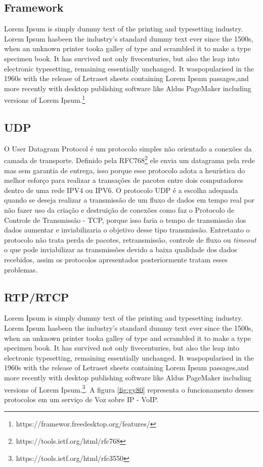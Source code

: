 \documentclass[
	12pt,				%
	openright,			%
	oneside,			%
	a4paper,			%
	chapter=TITLE,		%
	english,			%
	brazil,				%
	]{abntex2}
\begin{document}
\subsection{Framework}
Lorem Ipsum is simply dummy text of the printing and typesetting industry. Lorem Ipsum hasbeen the industry’s standard dummy text ever since the 1500s, when an unknown printer tooka galley of type and scrambled it to make a type specimen book. It has survived not only fivecenturies, but also the leap into electronic typesetting, remaining essentially unchanged. It waspopularised in the 1960s with the release of Letraset sheets containing Lorem Ipsum passages,and more recently with desktop publishing software like Aldus PageMaker including versions of Lorem Ipsum.\footnote{https://framewor.freedesktop.org/features/}

\subsection{UDP}
O User Datagram Protocol é um protocolo simples não orientado a conexões da camada de transporte. Definido pela RFC768\footnote{https://tools.ietf.org/html/rfc768} ele envia um  datagrama pela rede mas sem garantia de entrega, isso porque esse protocolo adota a heurística do melhor esforço para realizar a transações de pacotes entre dois computadores dentro de uma rede IPV4 ou IPV6.
 O protocolo UDP é a escolha adequada quando se deseja realizar a transmissão de um fluxo de dados em tempo real por não fazer uso da criação e destruição de conexões como faz o Protocolo de Controle de Transmissão - TCP, porque isso faria o tempo de transmissão dos dados aumentar e inviabilizaria o objetivo desse tipo transmissão. Entretanto o protocolo não trata perda de pacotes, retransmissão, controle de fluxo ou \textit{timeout} o que pode inviabilizar as transmissões devido a baixa qualidade dos dados recebidos, assim os protocolos apresentados posteriormente tratam esses problemas.

\subsection{RTP/RTCP}
Lorem Ipsum is simply dummy text of the printing and typesetting industry. Lorem Ipsum hasbeen the industry’s standard dummy text ever since the 1500s, when an unknown printer tooka galley of type and scrambled it to make a type specimen book. It has survived not only fivecenturies, but also the leap into electronic typesetting, remaining essentially unchanged. It waspopularised in the 1960s with the release of Letraset sheets containing Lorem Ipsum passages,and more recently with desktop publishing software like Aldus PageMaker including versions of Lorem Ipsum.\footnote{https://tools.ietf.org/html/rfc3550}.  A figura \ref{fig:gy80}  representa o funcionamento desses protocolos em um serviço de Voz sobre IP - VoIP.
\end{document}
